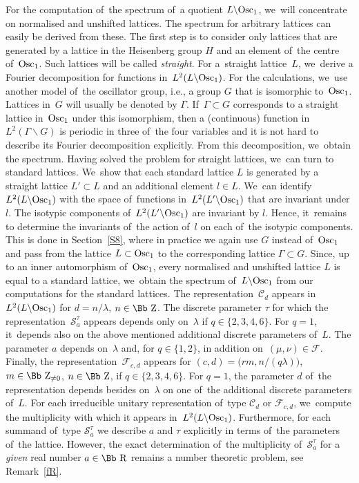 \documentclass[pdftex]{sigma}
\newcommand\RR{{\mbox{\Bb R}}}
\newcommand\ZZ{{\mbox{\Bb Z}}}
\newcommand\cC{{\mathcal C}}
\newcommand\cF{{\mathcal F}}
\newcommand{\Osc}{{\rm Osc}}
\numberwithin{equation}{section}
\begin{document}
 For the computation of~the spectrum of~a quotient $L\backslash \Osc_1$, we~will concentrate on normalised and unshifted lattices. The spectrum for arbitrary lattices can easily be derived from these. The first step is to consider only lattices that are generated by a lattice in the Heisenberg group $H$ and an element of~the centre of~$\Osc_1$. Such lattices will be called {\it straight}. For a~straight lattice~$L$, we~derive a Fourier decomposition for functions in~$L^2(L\backslash \Osc_1)$. For the calculations, we~use another model of~the oscillator group, i.e., a group $G$ that is isomorphic to~$\Osc_1$. Lattices in~$G$ will usually be denoted by $\Gamma$. If~$\Gamma\subset G$ corresponds to a straight lattice in~$\Osc_1$ under this isomorphism, then a (continuous) function in~$L^2(\Gamma\backslash G)$ is periodic in three of~the four variables and it is not hard to describe its Fourier decomposition explicitly. From this decomposition, we~obtain the spectrum. Having solved the problem for straight lattices, we~can turn to standard lattices. We~show that each standard lattice $L$ is generated by a straight lattice $L'\subset L$ and an additional element $l\in L$. We~can identify $L^2(L\backslash \Osc_1)$ with the space of~functions in~$L^2(L'\backslash \Osc_1)$ that are invariant under $l$. The isotypic components of~$L^2(L'\backslash \Osc_1)$ are invariant by $l$. Hence, it~remains to determine the invariants of~the action of~$l$ on each of~the isotypic components. This is done in Section~\ref{S8}, where in practice we again use $G$ instead of~$\Osc_1$ and pass from the lattice $L\subset \Osc_1$ to the corresponding lattice $\Gamma\subset G$.
Since, up to an inner automorphism of~$\Osc_1$, every normalised and unshifted lattice $L$ is equal to a standard lattice, we~obtain the spectrum of~$L\backslash \Osc_1$ from our computations for the standard lattices. The representation~$\cC_d$ appears in~$L^2(L\backslash \Osc_1)$ for $d=n/\lambda$, $n\in\ZZ$. The discrete parameter $\tau$ for which the representation~${\mathcal S}_a^\tau$ appears depends only on~$\lambda$ if $q\in\{2,3,4,6\}$. For $q=1$, it~depends also on the above mentioned additional discrete parameters of~$L$. The parameter $a$ depends on~$\lambda$ and, for $q\in\{1,2\}$, in addition on~$(\mu,\nu)\in\cF$. Finally, the representation~$\cF_{c,d}$ appears for $(c,d)=\big(rm,n/(q\lambda)\big)$, $m\in\ZZ_{\not=0}$, $n\in\ZZ$, if $q\in\{2,3,4,6\}$. For $q=1$, the parameter $d$ of~the representation depends besides on~$\lambda$ on one of~the additional discrete parameters of~$L$. For each irreducible unitary representation of~type $\cC_d$ or $\cF_{c,d}$, we~compute the multiplicity with which it appears in~$L^2(L\backslash \Osc_1)$. Furthermore, for each summand of~type ${\mathcal S}_a^\tau$ we describe $a$ and $\tau$ explicitly in terms of~the parameters of~the lattice. However, the exact determination of~the multiplicity of~${\mathcal S}_a^\tau$ for a \emph{given} real number $a\in\RR$ remains a number theoretic problem, see Remark~\ref{fR}.
\end{document}
